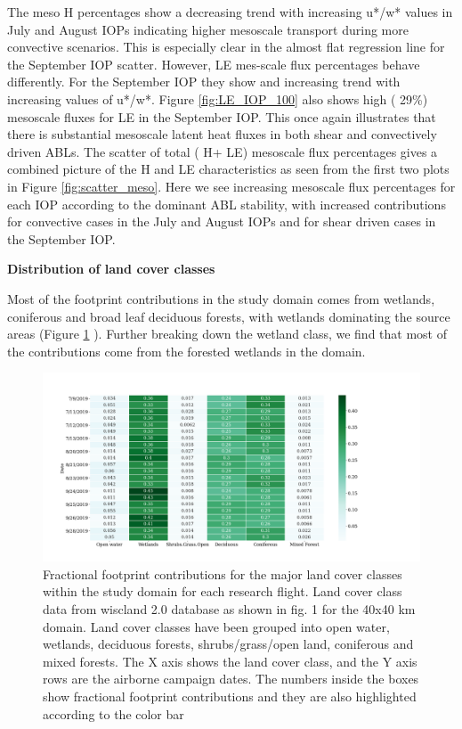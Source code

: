 \documentclass[draft]{agujournal2019}
\begin{document}
The meso H percentages show a decreasing trend with increasing u*/w* values in July and August IOPs indicating higher mesoscale transport during more convective scenarios. This is especially clear in the almost flat regression line for the September IOP scatter. However, LE mes-scale flux percentages behave differently. For the September IOP they show and increasing trend with increasing values of u*/w*. Figure \ref{fig:LE_IOP_100} also shows high ( 29\%) mesoscale fluxes for LE in the September IOP. This once again illustrates that there is substantial mesoscale latent heat fluxes in both shear and convectively driven ABLs. The scatter of total ( H+ LE) mesoscale flux percentages gives a combined picture of the H and LE characteristics as seen from the first two plots in Figure \ref{fig:scatter_meso}. Here we see increasing mesoscale flux percentages for each IOP according to the dominant ABL stability, with increased contributions for convective cases in the July and August IOPs and for shear driven cases in the September IOP.  

\textbf{Distribution of land cover classes}

Most of the footprint contributions in the study domain comes from wetlands, coniferous and  broad leaf deciduous forests, with wetlands dominating the source areas (Figure \ref{fig:footprint_fraction} ). Further breaking down the wetland class, we find that most of the contributions come from the forested wetlands in the domain.

 \begin{figure}[hbtp]
 \noindent\includegraphics[width=\textwidth]{figures_main/footprint_fraction.png}
\caption{ Fractional  footprint contributions for the major land cover classes within the study domain for each research flight.  Land cover class data from wiscland 2.0 database as shown in fig. 1 for the 40x40 km domain. Land cover classes have been grouped into open water, wetlands, deciduous forests, shrubs/grass/open land, coniferous and mixed forests.  The X axis shows the land cover class, and the Y axis rows are the airborne campaign dates. The numbers inside the boxes show fractional footprint contributions and they are also highlighted according to the color bar}
\label{fig:footprint_fraction}
 \end{figure}
\end{document}
